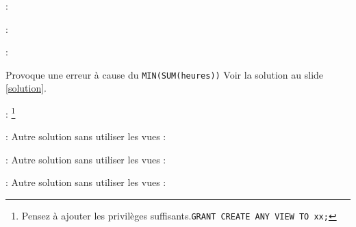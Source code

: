 \documentclass[10pt]{beamer}
\begin{document}
\begin{frame}{\secname : \subsecname}
    
\end{frame}

\begin{frame}{\secname : \subsecname}
    
\end{frame}

\begin{frame}{\secname : \subsecname}
    
    Provoque une erreur à cause du \lstinline[language=xml]!MIN(SUM(heures))! Voir la solution au slide \ref{solution}.
\end{frame}


\begin{frame}{\secname : \subsecname}
    \footnote{Pensez à ajouter les privilèges suffisants.\lstinline[language=plsql]!GRANT CREATE ANY VIEW TO xx;!}
\end{frame}

\begin{frame}{\secname : \subsecname}
    Autre solution sans utiliser les vues :
    
\end{frame}

\begin{frame}{\secname : \subsecname}
    Autre solution sans utiliser les vues :
    
\end{frame}

\begin{frame}{\secname : \subsecname}
    Autre solution sans utiliser les vues :
    
\end{frame}
\end{document}
